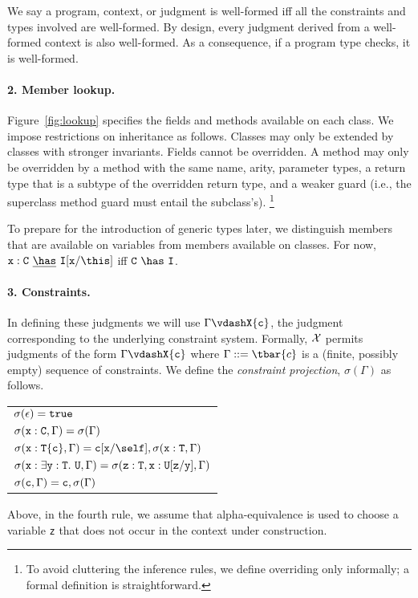 We say a program, context, or judgment is well-formed iff all the constraints and types involved are well-formed. By design, every judgment derived from a well-formed context is also well-formed. As a consequence, if a program type checks, it is well-formed.

\paragraph{2. Member lookup.} Figure~\ref{fig:lookup} specifies the fields and methods available on each class. We impose restrictions on inheritance as follows. Classes may only be extended by classes with stronger invariants. Fields cannot be overridden.
A method may only be overridden by a method with the same name,
arity, parameter types, a return type that is a subtype of the
overridden return type, and a weaker guard (i.e., the superclass
method guard must entail the subclass's).
\footnote{To avoid cluttering the inference rules, we
define overriding only informally; a formal definition is
straightforward.}

To prepare for the introduction of generic types later, we
distinguish members that are available on variables from members
available on classes.  For now,
${\tt x}:{\tt C}~\underline\has~{\tt I}[{\tt x}/\this]$ iff ${\tt C}~\has~{\tt I}$.

\paragraph{3. Constraints.}
In defining these judgments we will use \mbox{$\Gamma \vdashX {\tt c}$}, the judgment corresponding to the underlying constraint system. Formally, $\cal X$ permits judgments of the form $\Gamma \vdashX {\tt c}$ where $\Gamma::=\tbar{c}$ is a (finite, possibly empty) sequence of constraints. We define the {\em constraint
projection}, $\sigma(\Gamma)$ as follows.
%
\begin{center}
\begin{tabular}{l}
$\sigma(\epsilon)={\tt true}$\\
$\sigma({\tt x}:{\tt C}, \Gamma)=\sigma(\Gamma)$\\
$\sigma({\tt x}:{\tt T\{c\}}, \Gamma)={\tt c}[{\tt x}/\self], \sigma({\tt x}:{\tt T},\Gamma)$\\
$\sigma({\tt x}:\exists {\tt y}:{\tt T}.~{\tt U}, \Gamma)=\sigma({\tt z:T}, {\tt x}:{\tt U[{\tt z}/{\tt y}]},\Gamma)$\\
$\sigma({\tt c},\Gamma) = {\tt c}, \sigma(\Gamma)$
\end{tabular}
\end{center}
%
Above, in the fourth rule, 
we assume that alpha-equivalence is used to
choose a variable {\tt z} that does not
occur in the context under construction.

